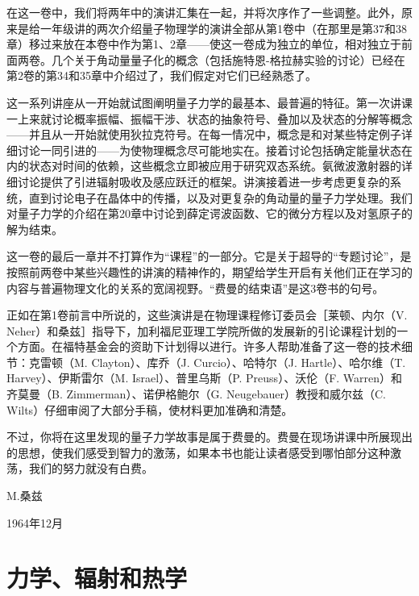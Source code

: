 \documentclass[UTF8, 12pt, a4paper, twoside]{ctexbook}
\begin{document}
在这一卷中，我们将两年中的演讲汇集在一起，并将次序作了一些调整。此外，原来是给一年级讲的两次介绍量子物理学的演讲全部从第1卷中（在那里是第37和38章）移过来放在本卷中作为第1、2章——使这一卷成为独立的单位，相对独立于前面两卷。几个关于角动量量子化的概念（包括施特恩-格拉赫实验的讨论）已经在第2卷的第34和35章中介绍过了，我们假定对它们已经熟悉了。

这一系列讲座从一开始就试图阐明量子力学的最基本、最普遍的特征。第一次讲课一上来就讨论概率振幅、振幅干涉、状态的抽象符号、叠加以及状态的分解等概念——并且从一开始就使用狄拉克符号。在每一情况中，概念是和对某些特定例子详细讨论一同引进的——为使物理概念尽可能地实在。接着讨论包括确定能量状态在内的状态对时间的依赖，这些概念立即被应用于研究双态系统。氨微波激射器的详细讨论提供了引进辐射吸收及感应跃迁的框架。讲演接着进一步考虑更复杂的系统，直到讨论电子在晶体中的传播，以及对更复杂的角动量的量子力学处理。我们对量子力学的介绍在第20章中讨论到薛定谔波函数、它的微分方程以及对氢原子的解为结束。

这一卷的最后一章并不打算作为“课程”的一部分。它是关于超导的“专题讨论”，是按照前两卷中某些兴趣性的讲演的精神作的，期望给学生开启有关他们正在学习的内容与普遍物理文化的关系的宽阔视野。“费曼的结束语”是这3卷书的句号。

正如在第1卷前言中所说的，这些演讲是在物理课程修订委员会［莱顿、内尔（V. Neher）和桑兹］指导下，加利福尼亚理工学院所做的发展新的引论课程计划的一个方面。在福特基金会的资助下计划得以进行。许多人帮助准备了这一卷的技术细节：克雷顿（M. Clayton）、库乔（J. Curcio）、哈特尔（J. Hartle）、哈尔维（T. Harvey）、伊斯雷尔（M. Israel）、普里乌斯（P. Preuss）、沃伦（F. Warren）和齐莫曼（B. Zimmerman）、诺伊格鲍尔（G. Neugebauer）教授和威尔兹（C. Wilts）仔细审阅了大部分手稿，使材料更加准确和清楚。

不过，你将在这里发现的量子力学故事是属于费曼的。费曼在现场讲课中所展现出的思想，使我们感受到智力的激荡，如果本书也能让读者感受到哪怕部分这种激荡，我们的努力就没有白费。

\hfill M.桑兹

\hfill 1964年12月

\newpage


\newpage

\renewcommand*\contentsname{详细目录}
\setcounter{tocdepth}{2}
\tableofcontents

\newpage

\setcounter{page}{1}

\part{力学、辐射和热学}
\end{document}
